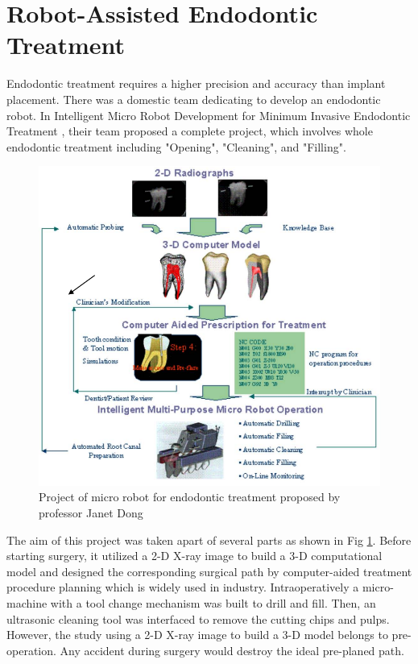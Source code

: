 \section{Robot-Assisted Endodontic Treatment}
\hspace*{6mm}Endodontic treatment requires a higher precision and accuracy than implant placement. There was a domestic team dedicating to develop an endodontic robot. In Intelligent Micro Robot Development for Minimum Invasive Endodontic Treatment \cite{dong2006wip}\cite{everett2014feasibility}\cite{dong2010design}, their team proposed a complete project, which involves whole endodontic treatment including "Opening", "Cleaning", and "Filling". 
\par
\begin{figure}[htbp]
	\begin{center}
	\includegraphics[width=0.95\linewidth]{Images/NCTU_2.png}
	\caption[Project of micro robot for endodontic treatment proposed by professor Janet Dong]{Project of micro robot for endodontic treatment proposed by professor Janet Dong \cite{everett2014feasibility}}	
	\label{fig:NCTU_2}
	\end{center}
\end{figure}
\par
The aim of this project was taken apart of several parts as shown in Fig \ref{fig:NCTU_2}. Before starting surgery, it utilized a 2-D X-ray image to build a 3-D computational model and designed the corresponding surgical path by computer-aided treatment procedure planning which is widely used in industry. Intraoperatively a micro-machine with a tool change mechanism was built to drill and fill. Then, an ultrasonic cleaning tool was interfaced to remove the cutting chips and pulps. However, the study using a 2-D X-ray image to build a 3-D model belongs to pre-operation. Any accident during surgery would destroy the ideal pre-planed path.
